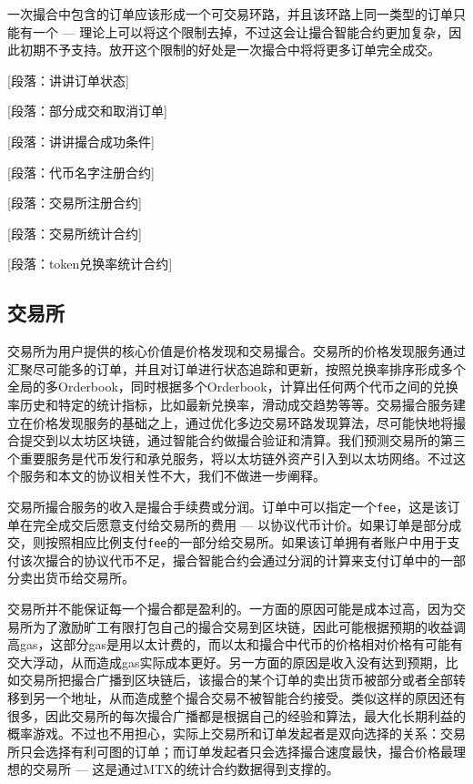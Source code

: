 \documentclass[UTF8,nofonts]{ctexart}
\begin{document}
一次撮合中包含的订单应该形成一个可交易环路，并且该环路上同一类型的订单只能有一个 --- 理论上可以将这个限制去掉，不过这会让撮合智能合约更加复杂，因此初期不予支持。放开这个限制的好处是一次撮合中将将更多订单完全成交。


[段落：讲讲订单状态]

[段落：部分成交和取消订单]

[段落：讲讲撮合成功条件]


[段落：代币名字注册合约]

[段落：交易所注册合约]

[段落：交易所统计合约]

[段落：token兑换率统计合约]


\subsection{交易所\label{sec:exchange}}

交易所为用户提供的核心价值是价格发现和交易撮合。交易所的价格发现服务通过汇聚尽可能多的订单，并且对订单进行状态追踪和更新，按照兑换率排序形成多个全局的多Orderbook，同时根据多个Orderbook，计算出任何两个代币之间的兑换率历史和特定的统计指标，比如最新兑换率，滑动成交趋势等等。交易撮合服务建立在价格发现服务的基础之上，通过优化多边交易环路发现算法，尽可能快地将撮合提交到以太坊区块链，通过智能合约做撮合验证和清算。我们预测交易所的第三个重要服务是代币发行和承兑服务，将以太坊链外资产引入到以太坊网络。不过这个服务和本文的协议相关性不大，我们不做进一步阐释。

交易所撮合服务的收入是撮合手续费或分润。订单中可以指定一个\verb|fee|，这是该订单在完全成交后愿意支付给交易所的费用 --- 以协议代币计价。如果订单是部分成交，则按照相应比例支付\verb|fee|的一部分给交易所。如果该订单拥有者账户中用于支付该次撮合的协议代币不足，撮合智能合约会通过分润的计算来支付订单中的一部分卖出货币给交易所。

交易所并不能保证每一个撮合都是盈利的。一方面的原因可能是成本过高，因为交易所为了激励旷工有限打包自己的撮合交易到区块链，因此可能根据预期的收益调高gas，这部分gas是用以太计费的，而以太和撮合中代币的价格相对价格有可能有交大浮动，从而造成gas实际成本更好。另一方面的原因是收入没有达到预期，比如交易所把撮合广播到区块链后，该撮合的某个订单的卖出货币被部分或者全部转移到另一个地址，从而造成整个撮合交易不被智能合约接受。类似这样的原因还有很多，因此交易所的每次撮合广播都是根据自己的经验和算法，最大化长期利益的概率游戏。不过也不用担心，实际上交易所和订单发起者是双向选择的关系：交易所只会选择有利可图的订单；而订单发起者只会选择撮合速度最快，撮合价格最理想的交易所 --- 这是通过MTX的统计合约数据得到支撑的。
\end{document}
